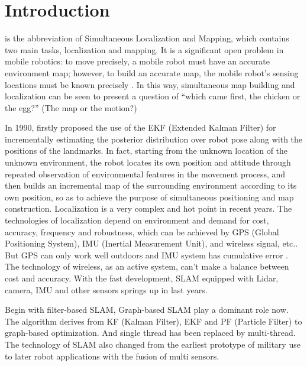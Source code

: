 \documentclass[journal,transmag]{IEEEtran}
\begin{document}
\IEEEdisplaynontitleabstractindextext

\IEEEpeerreviewmaketitle

\section{Introduction}

 is the abbreviation of Simultaneous Localization and Mapping, which contains two main tasks, localization and mapping. It is a significant open problem in mobile robotics: to move precisely, a mobile robot must have an accurate environment map; however, to build an accurate map, the mobile robot’s sensing locations must be known precisely \cite{leonard1991simultaneous}. In this way, simultaneous map building and localization can be seen to present a question of “which came first, the chicken or the egg?” (The map or the motion?) 

In 1990, \cite{smith1990estimating} firstly proposed the use of the EKF (Extended Kalman Filter) for incrementally estimating the posterior distribution over robot pose along with the positions of the landmarks. In fact, starting from the unknown location of the unknown environment, the robot locates its own position and attitude through repeated observation of environmental features in the movement process, and then builds an incremental map of the surrounding environment according to its own position, so as to achieve the purpose of simultaneous positioning and map construction. Localization is a very complex and hot point in recent years. The technologies of localization depend on environment and demand for cost, accuracy, frequency and robustness, which can be achieved by GPS (Global Positioning System), IMU (Inertial Measurement Unit), and wireless signal, etc.\cite{huang2019robust}\cite{liu2012iparking}. But GPS can only work well outdoors and IMU system has cumulative error \cite{liu2012hybrid}. The technology of wireless, as an active system, can't make a balance between cost and accuracy. With the fast development, SLAM equipped with Lidar, camera, IMU and other sensors springs up in last years.

Begin with filter-based SLAM, Graph-based SLAM play a dominant role now. The algorithm derives from KF (Kalman Filter), EKF and PF (Particle Filter) to graph-based optimization. And single thread has been replaced by multi-thread. The technology of SLAM also changed from the earliest prototype of military use to later robot applications with the fusion of multi sensors.
\end{document}
